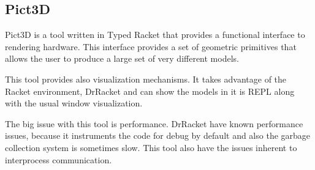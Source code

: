 
\subsection{Pict3D} %
\label{sub:pict3d}

Pict3D is a tool written in Typed Racket that provides a functional interface to rendering hardware. This interface provides a set of geometric primitives that allows the user to produce a large set of very different models.

This tool provides also visualization mechanisms. It takes advantage of the Racket environment, DrRacket and can show the models in it is REPL along with the usual window visualization.

The big issue with this tool is performance. DrRacket have known performance issues, because it instruments the code for debug by default and also the garbage collection system is sometimes slow. This tool also have the issues inherent to interprocess communication.


